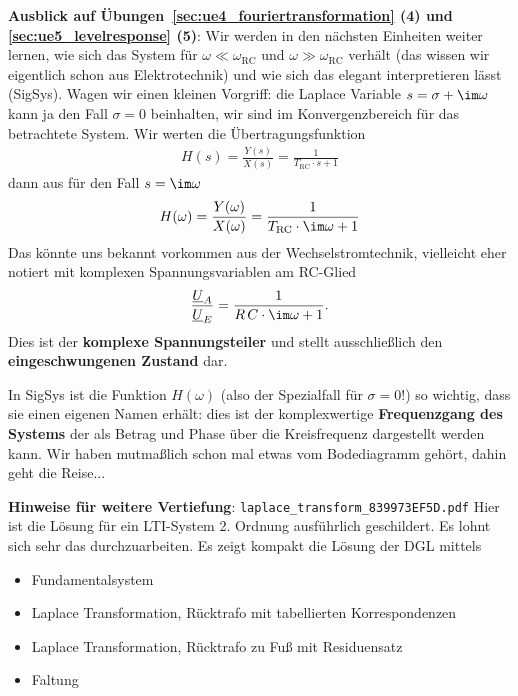 \clearpage
\begin{mdframed}
\textbf{Ausblick auf Übungen~\ref{sec:ue4_fouriertransformation} (4) und
\ref{sec:ue5_levelresponse} (5)}:
Wir werden in den nächsten Einheiten weiter lernen, wie sich das System
für $\omega\ll\omega_\mathrm{RC}$ und $\omega\gg\omega_\mathrm{RC}$
verhält (das wissen wir eigentlich schon aus Elektrotechnik) und wie sich das elegant
interpretieren lässt (SigSys).
Wagen wir einen kleinen Vorgriff: die Laplace Variable $s=\sigma + \im\omega$
kann ja den Fall $\sigma=0$ beinhalten, wir sind im Konvergenzbereich
für das betrachtete System. Wir werten die Übertragungsfunktion
\begin{align}
H(s) = \frac{Y(s)}{X(s)} = \frac{1}{T_\mathrm{RC} \cdot s + 1}
\end{align}
dann aus für den Fall $s=\im\omega$
\begin{align}
H(\omega) = \frac{Y(\omega)}{X(\omega)} =
\frac{1}{T_\mathrm{RC} \cdot \im\omega + 1}
\end{align}
Das könnte uns bekannt vorkommen aus der Wechselstromtechnik, vielleicht eher
notiert mit komplexen Spannungsvariablen am RC-Glied
\begin{align}
\frac{\underline{U}_A}{\underline{U}_E} =
\frac{1}{R\,C \cdot \im\omega + 1}.
\end{align}
Dies ist der \textbf{komplexe Spannungsteiler} und stellt
ausschließlich den \textbf{eingeschwungenen Zustand} dar.

In SigSys ist die Funktion $H(\omega)$ (also der Spezialfall
für $\sigma=0$!) so wichtig, dass sie einen eigenen Namen erhält: dies ist
der komplexwertige \textbf{Frequenzgang des Systems} der als Betrag und Phase
über die Kreisfrequenz dargestellt werden kann.
Wir haben mutmaßlich schon mal etwas vom Bodediagramm gehört, dahin geht die Reise...

\end{mdframed}

\textbf{Hinweise für weitere Vertiefung}:
\verb|laplace_transform_839973EF5D.pdf| Hier ist die Lösung für ein LTI-System
2. Ordnung ausführlich geschildert.
%
Es lohnt sich sehr das durchzuarbeiten.
Es zeigt kompakt die Lösung der DGL mittels
\begin{itemize}
\item Fundamentalsystem
\item Laplace Transformation, Rücktrafo mit tabellierten Korrespondenzen
\item Laplace Transformation, Rücktrafo zu Fuß mit Residuensatz
\item Faltung
\end{itemize}
